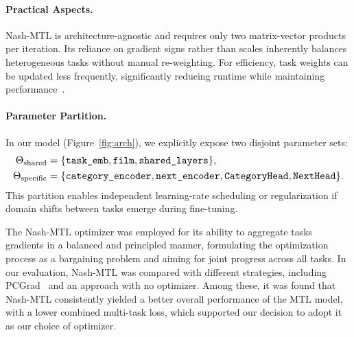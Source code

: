 \paragraph*{Practical Aspects.}
Nash-MTL is architecture-agnostic and requires only two matrix-vector products per iteration. Its reliance on gradient signs rather than scales inherently balances heterogeneous tasks without manual re-weighting. For efficiency, task weights can be updated less frequently, significantly reducing runtime while maintaining performance~\cite{nash}.


\paragraph*{Parameter Partition.}
In our model (Figure~\ref{fig:arch}), we explicitly expose two disjoint parameter sets:
\[
\resizebox{\linewidth}{!}{$%
  \begin{aligned}
    \Theta_{\text{shared}}   &= \{\texttt{task\_emb},\texttt{film},\texttt{shared\_layers}\},\\
    \Theta_{\text{specific}} &= \{\texttt{category\_encoder},\texttt{next\_encoder},
                                 \texttt{CategoryHead},\texttt{NextHead}\}.
  \end{aligned}
$}
\]
This partition enables independent learning-rate scheduling or regularization if domain shifts between tasks emerge during fine-tuning.

The Nash-MTL optimizer was employed for its ability to aggregate tasks gradients in a balanced and principled manner, formulating the optimization process as a bargaining problem and aiming for joint progress across all tasks. In our evaluation, Nash-MTL was compared with different strategies, including PCGrad~\cite{yu2020pcgrad}  and an approach with no optimizer. Among these, it was found that Nash-MTL consistently yielded a better overall performance of the MTL model, with a lower combined multi-task loss, which supported our decision to adopt it as our choice of optimizer.

